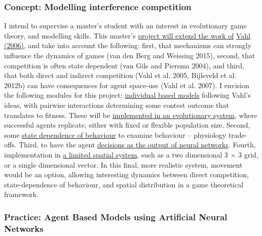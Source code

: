 \documentclass[]{scrartcl}
\begin{document}
\begin{linenumbers}
\subsubsection{Concept: Modelling interference
competition}\label{concept-modelling-interference-competition}

I intend to supervise a master's student with an interest in
evolutionary game theory, and modelling skills. This master's
\underline{project will extend the work of}
\protect\hypertarget{__UnoMark__39688_623588325}{}{\protect\hypertarget{__UnoMark__2639_580056431}{}{\protect\hypertarget{ZOTERO_BREF_AFrza5I3tbCu}{}{}}}\underline{Vahl
(2006)}, and take into account the following: first, that mechanisms can
strongly influence the dynamics of games
(\protect\hypertarget{__UnoMark__4293_580056431}{}{}van den Berg and
Weissing 2015), second, that competition is often state dependent
(\protect\hypertarget{__UnoMark__4300_580056431}{}{}van Gils and Piersma
2004), and third, that both direct and indirect competition
(\protect\hypertarget{__UnoMark__4307_580056431}{}{}Vahl et al. 2005,
Bijleveld et al. 2012b) can have consequences for agent space-use
(\protect\hypertarget{__UnoMark__4314_580056431}{}{}Vahl et al. 2007). I
envision the following modules for this project: \underline{individual based
models} following Vahl's ideas, with pairwise interactions determining
some contest outcome that translates to fitness. These will be
\underline{implemented in an evolutionary system}, where successful agents
replicate, either with fixed or flexible population size. Second, some
\underline{state dependence of behaviour} to examine behaviour -- physiology
trade-offs. Third, to have the agent \underline{decisions as the output of
neural networks}. Fourth, implementation in \underline{a limited spatial
system}, such as a two dimensional 3 × 3 grid, or a single dimensional
vector. In this final, more realistic system, movement would be an
option, allowing interesting dynamics between direct competition,
state-dependence of behaviour, and spatial distribution in a game
theoretical framework.

\subsubsection{Practice: Agent Based Models using Artificial Neural
Networks}\label{practice-agent-based-models-using-artificial-neural-networks}


\end{linenumbers}
\end{document}
